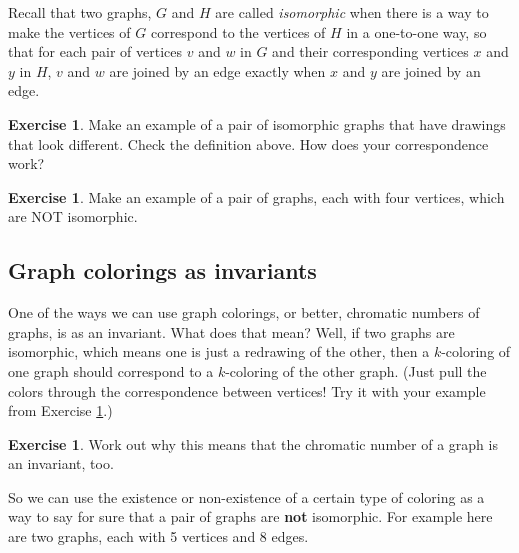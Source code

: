 \documentclass[12pt,letterpaper]{article}
\theoremstyle{definition}
\newtheorem{exercise}[question]{Exercise}
\begin{document}
Recall that two graphs, $G$ and $H$ are called \emph{isomorphic} when there is a way to make the
vertices of $G$ correspond to the vertices of $H$ in a one-to-one way, so that for each pair of vertices $v$ and $w$
in $G$ and their corresponding vertices $x$ and $y$ in $H$,  $v$ and $w$ are joined by an edge exactly when $x$ and $y$ are joined by an edge.

\begin{exercise}\label{ex:iso}
Make an example of a pair of isomorphic graphs that have drawings that look different. Check the definition above. 
How does your correspondence work?
\end{exercise}

\begin{exercise}
Make an example of a pair of graphs, each with four vertices, which are NOT isomorphic.
\end{exercise}

\subsection*{Graph colorings as invariants}

One of the ways we can use graph colorings, or better, chromatic numbers of graphs, is as an invariant.
What does that mean? Well, if two
graphs are isomorphic, which means one is just a redrawing of the other, then a $k$-coloring of one graph 
should correspond to a $k$-coloring of the other graph. (Just pull the colors through the correspondence between
vertices! Try it with your example from Exercise \ref{ex:iso}.) 

\begin{exercise}
Work out why this means that the chromatic number of a graph is an invariant, too.
\end{exercise}

So we can use the existence or non-existence of a certain type of coloring as a way to say for sure that a pair of
graphs are \textbf{not} isomorphic. For example here are two graphs, each with 5 vertices and 8 edges.
\end{document}
